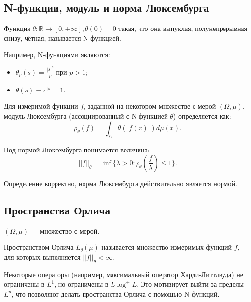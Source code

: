 \documentclass[../NDCNNAI_main.tex]{subfiles}
\begin{document}
\subsection{N-функции, модуль и норма Люксембурга}

\begin{definition}
Функция $\theta\colon\mathbb{R}\to[0,+\infty], \theta(0)=0$ такая, 
что она выпуклая, полунепрерывная снизу, чётная, называется N-функцией.
\end{definition}

Например, N-функциями являются:
\begin{itemize}
    \item $\theta_p(s)=\frac{|s|^p}{p} \text{ при }p>1;$ 
    \item $\theta(s)=e^{|s|}-1.$
\end{itemize}

\begin{definition}
Для измеримой функции $f$, заданной на некотором множестве с мерой $(\Omega, \mu)$, 
модуль Люксембурга (ассоциированный с N-функцией $\theta$)
определяется как:
$$\rho_\theta(f)=\int_\Omega\theta(|f(x)|)d\mu(x).$$
\end{definition}

\begin{definition}
Под нормой Люксембурга понимается величина:
$$||f||_\theta=\inf\{\lambda>0\colon\rho_\theta\left(\frac{f}{\lambda}\right)\le1\}.$$
\end{definition}

\begin{remark}
Определение корректно, норма Люксембурга действительно является нормой.
\end{remark}

\subsection{Пространства Орлича}
$(\Omega, \mu)$ --- множество с мерой.

\begin{definition}
Пространством Орлича $L_\theta(\mu)$ называется множество измеримых функций $f$, 
для которых выполняется $||f||_\theta<\infty$.
\end{definition}

\begin{remark}
Некоторые операторы (например, максимальный оператор Харди-Литтлвуда) не ограничены в $L^1$, но ограничены в $L\log^+L$. Это мотивирует выйти за пределы $L^p$, что позволяют делать пространства Орлича с помощью N-функций.
\end{remark}
\end{document}
